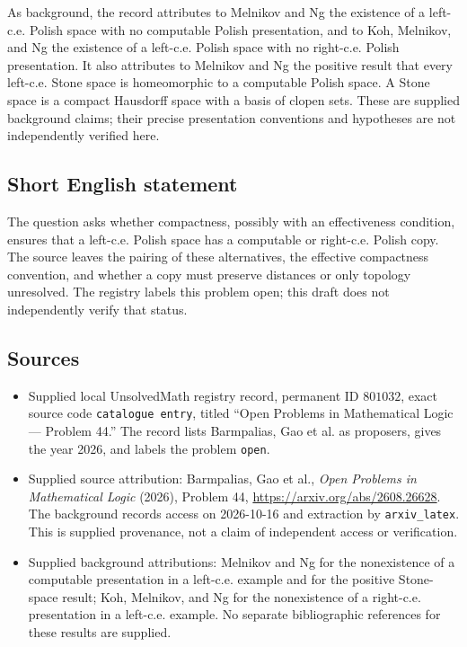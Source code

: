 \documentclass[11pt]{article}
\begin{document}
As background, the record attributes to Melnikov and Ng the existence of a left-c.e. Polish space with no computable Polish presentation, and to Koh, Melnikov, and Ng the existence of a left-c.e. Polish space with no right-c.e. Polish presentation. It also attributes to Melnikov and Ng the positive result that every left-c.e. Stone space is homeomorphic to a computable Polish space. A Stone space is a compact Hausdorff space with a basis of clopen sets. These are supplied background claims; their precise presentation conventions and hypotheses are not independently verified here.
\subsection{Short English statement}
The question asks whether compactness, possibly with an effectiveness condition, ensures that a left-c.e. Polish space has a computable or right-c.e. Polish copy. The source leaves the pairing of these alternatives, the effective compactness convention, and whether a copy must preserve distances or only topology unresolved. The registry labels this problem open; this draft does not independently verify that status.
\subsection{Sources}
\begin{itemize}
\item Supplied local UnsolvedMath registry record, permanent ID \(801032\), exact source code \texttt{catalogue entry}, titled ``Open Problems in Mathematical Logic --- Problem 44.'' The record lists Barmpalias, Gao et al. as proposers, gives the year 2026, and labels the problem \texttt{open}.
\item Supplied source attribution: Barmpalias, Gao et al., \emph{Open Problems in Mathematical Logic} (2026), Problem 44, \url{https://arxiv.org/abs/2608.26628}. The background records access on 2026-10-16 and extraction by \texttt{arxiv\_latex}. This is supplied provenance, not a claim of independent access or verification.
\item Supplied background attributions: Melnikov and Ng for the nonexistence of a computable presentation in a left-c.e. example and for the positive Stone-space result; Koh, Melnikov, and Ng for the nonexistence of a right-c.e. presentation in a left-c.e. example. No separate bibliographic references for these results are supplied.
\end{itemize}
\end{document}
